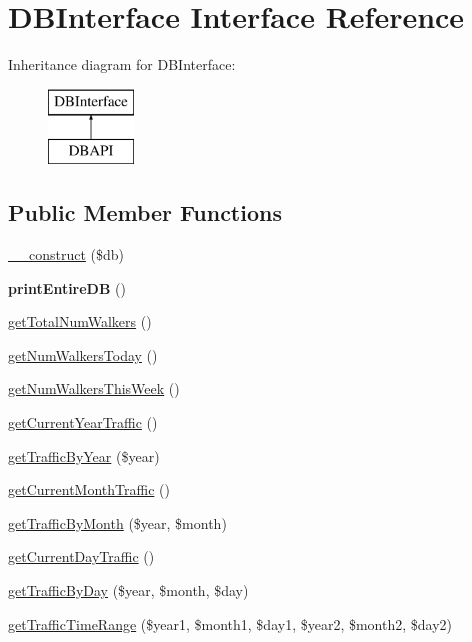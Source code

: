 \hypertarget{interface_d_b_interface}{}\section{D\+B\+Interface Interface Reference}
\label{interface_d_b_interface}
Inheritance diagram for D\+B\+Interface\+:\begin{figure}[H]
\begin{center}
\leavevmode
\includegraphics[height=2.000000cm]{interface_d_b_interface}
\end{center}
\end{figure}
\subsection*{Public Member Functions}
\begin{DoxyCompactItemize}
\item 
\hyperlink{interface_d_b_interface_a800f8efee13692788b13ee57c5960092}{\+\_\+\+\_\+construct} (\$db)
\item 
{\bfseries print\+Entire\+DB} ()\hypertarget{interface_d_b_interface_a7e02b55449fecf4bed4ca717f38dafd5}{}\label{interface_d_b_interface_a7e02b55449fecf4bed4ca717f38dafd5}

\item 
\hyperlink{interface_d_b_interface_ab7a902c85d04b9973a30b73963cb3270}{get\+Total\+Num\+Walkers} ()
\item 
\hyperlink{interface_d_b_interface_adf40141a9763141c0eaeb9ce620181ad}{get\+Num\+Walkers\+Today} ()
\item 
\hyperlink{interface_d_b_interface_ae7a2342889cfd984513ba17ddbd14bef}{get\+Num\+Walkers\+This\+Week} ()
\item 
\hyperlink{interface_d_b_interface_ad487abf76c66536778a43009612b6843}{get\+Current\+Year\+Traffic} ()
\item 
\hyperlink{interface_d_b_interface_a82c5e558141dca62c793baf0d1216bc0}{get\+Traffic\+By\+Year} (\$year)
\item 
\hyperlink{interface_d_b_interface_ae1b5c3c8112356b5c8ea9184286ec89a}{get\+Current\+Month\+Traffic} ()
\item 
\hyperlink{interface_d_b_interface_a0e954fca184f4b8ac04f51cb0c558def}{get\+Traffic\+By\+Month} (\$year, \$month)
\item 
\hyperlink{interface_d_b_interface_a50aa5202dd6a6314b4b0da6fd3026415}{get\+Current\+Day\+Traffic} ()
\item 
\hyperlink{interface_d_b_interface_a732a3a52aedfb5dd4b63f7292cb8ec3b}{get\+Traffic\+By\+Day} (\$year, \$month, \$day)
\item 
\hyperlink{interface_d_b_interface_a546615c71715e031c6218799e97937ab}{get\+Traffic\+Time\+Range} (\$year1, \$month1, \$day1, \$year2, \$month2, \$day2)
\end{DoxyCompactItemize}


